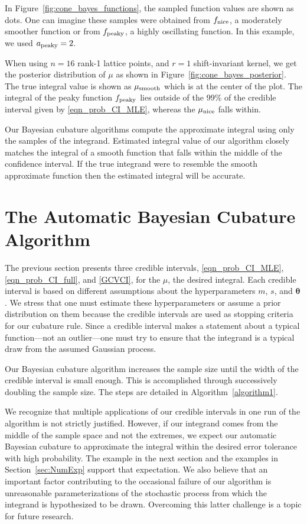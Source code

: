 \documentclass{svjour3}                     %
\newcommand{\bm}[1]{\boldsymbol{#1}}
\newcommand{\vtheta}{{\bm{\theta}}}
\newcommand{\vx}{\bm{x}}
\newcommand{\NICE}{\textup{nice}}
\newcommand{\PEAKY}{\textup{peaky}}
\newcommand{\TRUE}{\textup{smooth}}
\newcommand\figref{Figure~\ref}
\begin{document}
In \figref{fig:cone_bayes_functions}, the sampled function values
are shown as dots. One can imagine these samples %
were obtained from $f_{\NICE}$, a moderately smoother function or from $f_{\PEAKY}$, a highly oscillating function. In this example, we used $a_{\PEAKY} = 2$.

When using $n=16$ rank-1 lattice points, and $r=1$ shift-invariant kernel, we get the posterior distribution of $\mu$ as shown in \figref{fig:cone_bayes_posterior}. The true integral value is shown as $\mu_{\TRUE}$ which is at the center of the plot. The integral of the peaky function $f_{\PEAKY}$ lies outside of the 99\% of the credible interval given by \eqref{eqn_prob_CI_MLE}, whereas the $\mu_{\NICE}$ falls within.

Our Bayesian cubature algorithms compute the approximate integral using only the samples of the integrand. 
Estimated integral value of our algorithm closely matches the integral of a smooth function that falls within the middle of the confidence interval. If the true integrand were to resemble the smooth approximate function then the estimated integral will be accurate.  






\section{The Automatic Bayesian Cubature Algorithm} 


The previous section presents three credible intervals, \eqref{eqn_prob_CI_MLE}, \eqref{eqn_prob_CI_full}, and \eqref{GCVCI}, for the $\mu$, the desired integral.  Each credible interval is based on different assumptions about the hyperparameters $m$, $s$, and $\vtheta$.  We stress that one must estimate these hyperparameters or assume a prior distribution on them because the credible intervals are used as stopping criteria for our cubature rule.  Since a credible interval makes a statement about a typical function---not an outlier---one must try to ensure that the integrand is a typical draw from the assumed Gaussian process.

Our  Bayesian cubature algorithm increases the sample size until the width of the credible interval is small enough.  This is accomplished through successively doubling the sample size.  The steps are detailed in Algorithm~\ref{algorithm1}.

We recognize that multiple applications of our credible intervals in one run of the algorithm is not strictly justified.  However, if our integrand comes from the middle of the sample space and not the extremes, we expect our automatic Bayesian cubature to approximate the integral within the desired error tolerance with high probability.  The example in the next section and the examples in Section~\ref{sec:NumExp} support that expectation. We also believe that an important factor contributing to the occasional failure of our algorithm is unreasonable parameterizations of the stochastic process from which the integrand is hypothesized to be drawn.  Overcoming this latter challenge is a topic for future research.
\end{document}
